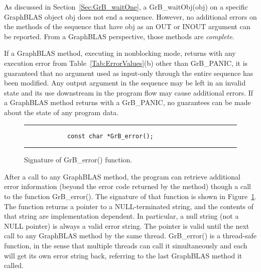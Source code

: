 As discussed in Section~\ref{Sec:GrB_waitOne}, a {\sf GrB\_waitObj(obj)} on
a specific GraphBLAS object {\sf obj} does not end a
sequence. However, no additional errors on the methods of the sequence that 
have {\sf obj} as an {\sf OUT} or {\sf INOUT} argument can be reported.
From a GraphBLAS perspective, those methods are {\em complete}.

If a GraphBLAS method, executing in nonblocking mode, returns with
any execution error from Table~\ref{Tab:ErrorValues}(b) other than
{\sf GrB\_PANIC}, it is guaranteed that no argument used as input-only
through the entire sequence has been modified.  Any output argument in
the sequence may be left in an invalid state and its use downstream in the
program flow may cause additional errors.  If a GraphBLAS method returns
with a {\sf GrB\_PANIC}, no guarantees can be made about the state of
any program data.

\begin{figure}[tb]
    \hrule
    \vspace{1\baselineskip}
    \begin{center}
        \begin{minipage}{3in}
            \begin{verbatim}
            const char *GrB_error();
            \end{verbatim}
        \end{minipage}
    \end{center}
    \caption{Signature of {\sf GrB\_error()} function.}
    \label{Fig:GrB_error}
    \hrule
\end{figure}

After a call to any GraphBLAS method, the program can retrieve additional
error information (beyond the error code returned by the method) though a
call to the function {\sf GrB\_error()}. The signature of that function is
shown in Figure~\ref{Fig:GrB_error}.  The function returns a pointer to a 
NULL-terminated string, and the contents of that string are implementation 
dependent. In particular, a null string (not a {\sf NULL} pointer) is always a valid error string.
The pointer is valid until the next call to any GraphBLAS method by the same thread.
{\sf GrB\_error()} is a thread-safe function, in the sense that multiple threads can
call it simultaneously and each will get its own error string back, referring to the
last GraphBLAS method it called.
